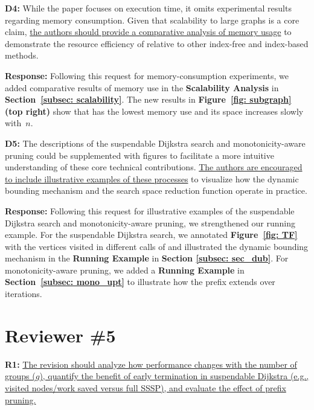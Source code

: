 \textbf{D4:} While the paper focuses on execution time, it omits experimental results regarding memory consumption. Given that scalability to large graphs is a core claim, \uline{the authors should provide a comparative analysis of memory usage} to demonstrate the resource efficiency of \Improved relative to other index-free and index-based methods.

\textbf{Response:} Following this request for memory-consumption experiments, we added comparative results of memory use in the \textbf{Scalability Analysis} in \textbf{Section~\ref{subsec: scalability}}. The new results in \textbf{Figure~\ref{fig: subgraph} (top right)} show that \ImprovPTS has the lowest memory use and its space increases slowly with~$n$.

\textbf{D5:} The descriptions of the suspendable Dijkstra search and monotonicity-aware pruning could be supplemented with figures to facilitate a more intuitive understanding of these core technical contributions. \uline{The authors are encouraged to include illustrative examples of these processes} to visualize how the dynamic bounding mechanism and the search space reduction function operate in practice.

\textbf{Response:} Following this request for illustrative examples of the suspendable Dijkstra search and monotonicity-aware pruning, we strengthened our running example. For the suspendable Dijkstra search, we annotated \textbf{Figure~\ref{fig: TF}} with the vertices visited in different calls of \PartialDijkstra and illustrated the dynamic bounding mechanism in the \textbf{Running Example} in \textbf{Section \ref{subsec: sec_dub}}. For monotonicity-aware pruning, we added a \textbf{Running Example} in \textbf{Section~\ref{subsec: mono_upt}} to illustrate how the prefix extends over iterations.

\section*{Reviewer \#5}

\textbf{R1:} \uline{The revision should analyze how performance changes with the number of groups ($g$), quantify the benefit of early termination in suspendable Dijkstra (e.g., visited nodes/work saved versus full SSSP), and evaluate the effect of prefix pruning.}

